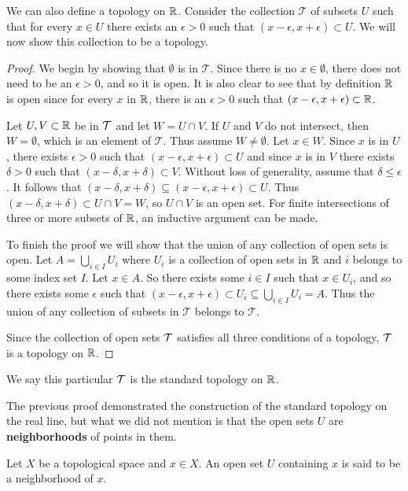 We can also define a topology on $\mathbb{R}$. Consider the collection $\mathcal{T}$ of subsets $U$ such that for every $x \in U$ there exists an $\epsilon >0$ such that $(x-\epsilon, x+\epsilon)\subset U$. We will now show this collection to be a topology.


\begin{proof}
We begin by showing that $\emptyset$ is in $\mathcal{T}$. Since there is no $x \in \emptyset$, there does not need to be an $\epsilon >0$, and so it is open. It is also clear to see that by definition $\mathbb{R}$ is open since for every $x$ in $\mathbb{R}$, there is an $\epsilon >0$ such that $(x-\epsilon, x+\epsilon) \subset \mathbb{R}$.

Let $U,V \subset \mathbb{R}$ be in $\mathcal{T}$ and let $W = U \cap V$. If $U$ and $V$ do not intersect, then $W=\emptyset$, which is an element of $\mathcal{T}$. Thus assume $W\neq \emptyset$. Let $x \in W$. Since $x$ is in $U$, there exists $\epsilon>0$ such that $(x-\epsilon, x+\epsilon)\subset U$ and since $x$ is in $V$ there exists $\delta>0$ such that $(x-\delta, x+\delta)\subset V$. Without loss of generality, assume that $\delta \leq \epsilon$. It follows that $(x-\delta, x+\delta) \subseteq (x-\epsilon, x+\epsilon) \subset U$. Thus $(x-\delta, x+\delta)\subset U \cap V = W$, so $U\cap V$ is an open set. For finite intersections of three or more subsets of $\mathbb{R}$, an inductive argument can be made.

To finish the proof we will show that the union of any collection of open sets is open. Let $A=\bigcup_{i\in I} U_i$ where ${U_i}$ is a collection of open sets in $\mathbb{R}$ and $i$ belongs to some index set $I$. Let $x \in A$. So there exists some $i\in I$ such that $x\in U_i$, and so there exists some $\epsilon $ such that $(x-\epsilon,x+\epsilon)\subset U_i \subseteq  \bigcup_{i\in I} U_i = A$. Thus the union of any collection of subsets in $\mathcal{T}$ belongs to $\mathcal{T}$.

Since the collection of open sets $\mathcal{T}$ satisfies all three conditions of a topology, $\mathcal{T}$ is a topology on $\mathbb{R}$. 
\end{proof}

We say this particular $\mathcal{T}$ is the standard topology on $\mathbb{R}$. 

The previous proof demonstrated the construction of the standard topology on the real line, but what we did not mention is that the open sets $U$ are \textbf{neighborhoods} of points in them.  

\begin{defn}
Let $X$ be a topological space and $x\in X$. An open set $U$ containing $x$ is said to be a neighborhood of $x$.
\end{defn}


